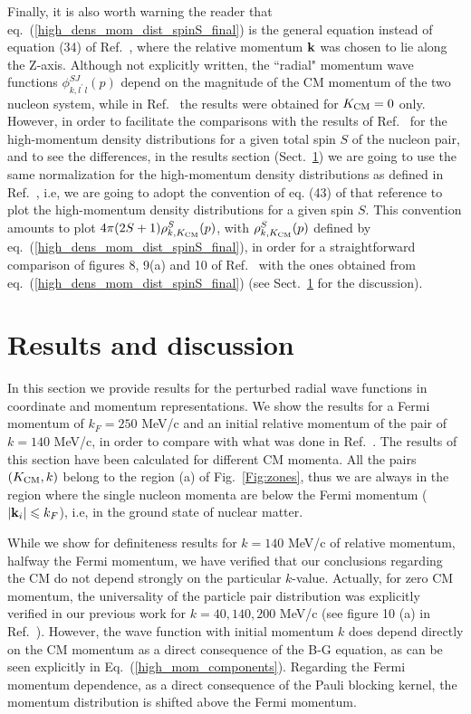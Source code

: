 \documentclass[aps,twocolumn,showpacs,preprintnumbers,amsmath,amssymb,nofootinbib,superscriptaddress,showkeys,noeprint]{revtex4-1}
\newcommand{\nk}{{\bf k}}
\begin{document}
Finally, it is also worth warning the reader that
eq.~(\ref{high_dens_mom_dist_spinS_final}) is the general equation
instead of equation (34) of Ref.~\cite{RuizSimo:2017tcb}, where the
relative momentum $\nk$ was chosen to lie along the Z-axis. Although
not explicitly written, the ``radial" momentum wave functions
$\phi_{k,l^\prime\,l}^{SJ}(p)$ depend on the magnitude of the CM
momentum of the two nucleon system, while in
Ref.~\cite{RuizSimo:2017tcb} the results were obtained for $K_{\rm
  CM}=0$ only.  However, in order to facilitate the comparisons with
the results of Ref.~\cite{RuizSimo:2017tcb} for the high-momentum
density distributions for a given total spin $S$ of the nucleon pair,
and to see the differences, in the results section
(Sect.~\ref{Sec:results}) we are going to use the same normalization
for the high-momentum density distributions as defined in
Ref.~\cite{RuizSimo:2017tcb}, i.e, we are going to adopt the
convention of eq. (43) of that reference to plot the high-momentum
density distributions for a given spin $S$.  This convention amounts
to plot $4\pi(2S+1)\rho^{S}_{k,K_{\rm CM}}(p)$, with
$\rho^{S}_{k,K_{\rm CM}}(p)$ defined by
eq.~(\ref{high_dens_mom_dist_spinS_final}), in order for a
straightforward comparison of figures 8, 9(a) and 10 of
Ref.~\cite{RuizSimo:2017tcb} with the ones obtained from
eq.~(\ref{high_dens_mom_dist_spinS_final}) (see
Sect.~\ref{Sec:results} for the discussion).


\section{Results and discussion}\label{Sec:results}
In this section we provide results for the perturbed radial wave
functions in coordinate and momentum representations. We show the
results for a Fermi momentum of $k_F=250$ MeV/c and an initial
relative momentum of the pair of $k=140$ MeV/c, in order to compare
with what was done in Ref.~\cite{RuizSimo:2017tcb}. The results of
this section have been calculated for different CM momenta. All the
pairs $(K_{\rm CM},k)$ belong to the region (a) of
Fig.~\ref{Fig:zones}, thus we are always in the region where the
single nucleon momenta are below the Fermi momentum ($\left| \nk_i
\right| \leqslant k_F$), i.e, in the ground state of nuclear matter.

While we show for definiteness results for $k=140$ MeV/c of relative
momentum, halfway the Fermi momentum, we have verified that our
conclusions regarding the CM do not depend strongly on the particular
$k$-value. Actually, for zero CM momentum, the universality of the
particle pair distribution was explicitly verified in our previous
work for $k=40,140,200$ MeV/c (see figure 10 (a) in
Ref.~\cite{RuizSimo:2017tcb}).  However, the wave function with
initial momentum $k$ does depend directly on the CM momentum as a
direct consequence of the B-G equation, as can be seen explicitly in
Eq.~(\ref{high_mom_components}).  Regarding the Fermi momentum
dependence, as a direct consequence of the Pauli blocking kernel, the
momentum distribution is shifted above the Fermi momentum.
\end{document}
